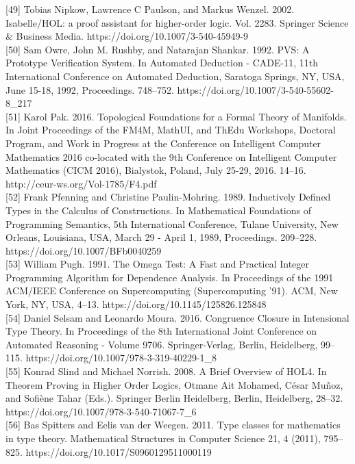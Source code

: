 \documentclass[
]{article}
\begin{document}
{[}49{]} Tobias Nipkow, Lawrence C Paulson, and Markus Wenzel. 2002.
Isabelle/HOL: a proof assistant for higher-order logic. Vol. 2283.
Springer Science \& Business Media.
https://doi.org/10.1007/3-540-45949-9\\
{[}50{]} Sam Owre, John M. Rushby, and Natarajan Shankar. 1992. PVS: A
Prototype Verification System. In Automated Deduction - CADE-11, 11th
International Conference on Automated Deduction, Saratoga Springs, NY,
USA, June 15-18, 1992, Proceedings. 748--752.
https://doi.org/10.1007/3-540-55602-8\_217\\
{[}51{]} Karol Pak. 2016. Topological Foundations for a Formal Theory of
Manifolds. In Joint Proceedings of the FM4M, MathUI, and ThEdu
Workshops, Doctoral Program, and Work in Progress at the Conference on
Intelligent Computer Mathematics 2016 co-located with the 9th Conference
on Intelligent Computer Mathematics (CICM 2016), Bialystok, Poland, July
25-29, 2016. 14--16. http://ceur-ws.org/Vol-1785/F4.pdf\\
{[}52{]} Frank Pfenning and Christine Paulin-Mohring. 1989. Inductively
Defined Types in the Calculus of Constructions. In Mathematical
Foundations of Programming Semantics, 5th International Conference,
Tulane University, New Orleans, Louisiana, USA, March 29 - April 1,
1989, Proceedings. 209--228. https://doi.org/10.1007/BFb0040259\\
{[}53{]} William Pugh. 1991. The Omega Test: A Fast and Practical
Integer Programming Algorithm for Dependence Analysis. In Proceedings of
the 1991 ACM/IEEE Conference on Supercomputing (Supercomputing '91).
ACM, New York, NY, USA, 4--13. https://doi.org/10.1145/125826.125848\\
{[}54{]} Daniel Selsam and Leonardo Moura. 2016. Congruence Closure in
Intensional Type Theory. In Proceedings of the 8th International Joint
Conference on Automated Reasoning - Volume 9706. Springer-Verlag,
Berlin, Heidelberg, 99--115.
https://doi.org/10.1007/978-3-319-40229-1\_8\\
{[}55{]} Konrad Slind and Michael Norrish. 2008. A Brief Overview of
HOL4. In Theorem Proving in Higher Order Logics, Otmane Ait Mohamed,
César Muñoz, and Sofiène Tahar (Eds.). Springer Berlin Heidelberg,
Berlin, Heidelberg, 28--32.
https://doi.org/10.1007/978-3-540-71067-7\_6\\
{[}56{]} Bas Spitters and Eelis van der Weegen. 2011. Type classes for
mathematics in type theory. Mathematical Structures in Computer Science
21, 4 (2011), 795--825. https://doi.org/10.1017/S0960129511000119\\
\end{document}
